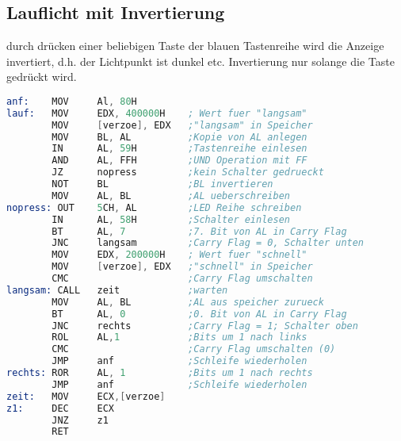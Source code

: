 \documentclass[10pt, a4paper]{report}
\begin{document}
\subsection*{Lauflicht mit Invertierung}
durch drücken einer beliebigen Taste der blauen Tastenreihe wird die Anzeige invertiert, d.h. der Lichtpunkt ist dunkel etc. Invertierung nur solange die Taste gedrückt wird.
\begin{lstlisting}[language=Assembler]
anf:    MOV     Al, 80H
lauf:   MOV     EDX, 400000H    ; Wert fuer "langsam"
        MOV     [verzoe], EDX   ;"langsam" in Speicher
        MOV     BL, AL          ;Kopie von AL anlegen
        IN      AL, 59H         ;Tastenreihe einlesen
        AND     AL, FFH         ;UND Operation mit FF
        JZ      nopress         ;kein Schalter gedrueckt
        NOT     BL              ;BL invertieren
        MOV     AL, BL          ;AL ueberschreiben
nopress: OUT    5CH, AL         ;LED Reihe schreiben
        IN      AL, 58H         ;Schalter einlesen
        BT      AL, 7           ;7. Bit von AL in Carry Flag
        JNC     langsam         ;Carry Flag = 0, Schalter unten
        MOV     EDX, 200000H    ; Wert fuer "schnell"
        MOV     [verzoe], EDX   ;"schnell" in Speicher
        CMC                     ;Carry Flag umschalten
langsam: CALL   zeit            ;warten
        MOV     AL, BL          ;AL aus speicher zurueck
        BT      AL, 0           ;0. Bit von AL in Carry Flag
        JNC     rechts          ;Carry Flag = 1; Schalter oben
        ROL     AL,1            ;Bits um 1 nach links
        CMC                     ;Carry Flag umschalten (0)
        JMP     anf             ;Schleife wiederholen
rechts: ROR     AL, 1           ;Bits um 1 nach rechts
        JMP     anf             ;Schleife wiederholen
zeit:   MOV     ECX,[verzoe]
z1:     DEC     ECX
        JNZ     z1
        RET
\end{lstlisting}
\end{document}
